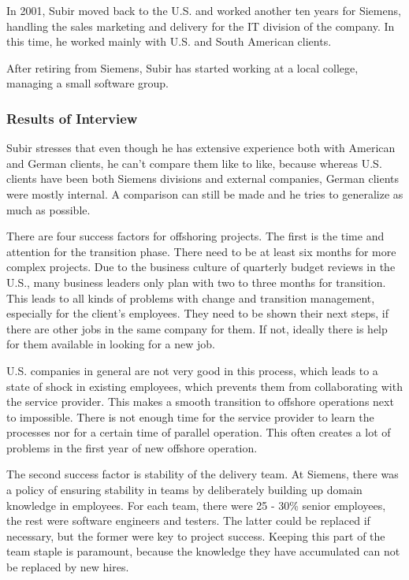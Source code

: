 In 2001, Subir moved back to the U.S. and worked another ten years for Siemens, handling the sales marketing and delivery for the IT division of the company. In this time, he worked mainly with U.S. and South American clients.

After retiring from Siemens, Subir has started working at a local college, managing a small software group.

\subsubsection{Results of Interview}

Subir stresses that even though he has extensive experience both with American and German clients, he can't compare them like to like, because whereas U.S. clients have been both Siemens divisions and external companies, German clients were mostly internal. A comparison can still be made and he tries to generalize as much as possible.

There are four success factors for offshoring projects. The first is the time and attention for the transition phase. There need to be at least six months for more complex projects. Due to the business culture of quarterly budget reviews in the U.S., many business leaders only plan with two to three months for transition. This leads to all kinds of problems with change and transition management, especially for the client's employees. They need to be shown their next steps, if there are other jobs in the same company for them. If not, ideally there is help for them available in looking for a new job.

U.S. companies in general are not very good in this process, which leads to a state of shock in existing employees, which prevents them from collaborating with the service provider. This makes a smooth transition to offshore operations next to impossible. There is not enough time for the service provider to learn the processes nor for a certain time of parallel operation. This often creates a lot of problems in the first year of new offshore operation.

The second success factor is stability of the delivery team. At Siemens, there was a policy of ensuring stability in teams by deliberately building up domain knowledge in employees. For each team, there were 25 - 30\% senior employees, the rest were software engineers and testers. The latter could be replaced if necessary, but the former were key to project success. Keeping this part of the team staple is paramount, because the knowledge they have accumulated can not be replaced by new hires. 

